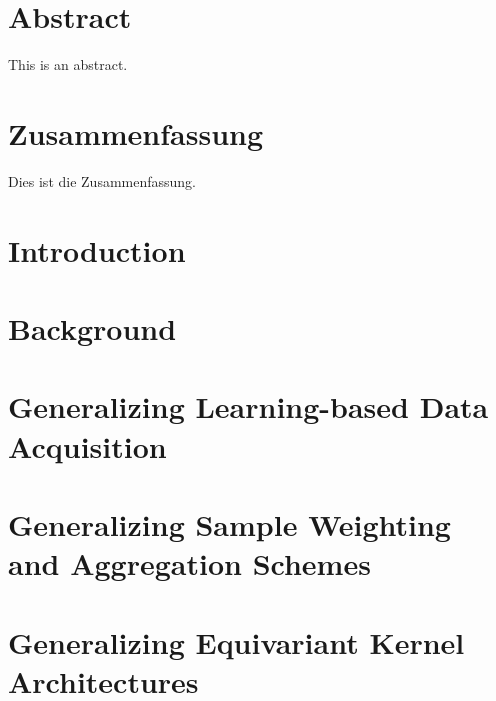\documentclass[11pt, a4paper, oneside, headsepline, titlepage, DIV=11, BCOR=12mm, captions=tableheading, chapterprefix=on, numbers=noenddot]{scrbook}
\begin{document}
    \thispagestyle{headings}
    

    \enlargethispage{1\baselineskip}
    \setcounter{page}{1}

    \chapter*{Abstract} %
        This is an abstract.
    \cleardoublepage

    \chapter*{Zusammenfassung} %
        Dies ist die Zusammenfassung.
    \cleardoublepage

    \tableofcontents
    \cleardoublepage

    \chapter{Introduction} %
    

    \chapter{Background} %
    

    \chapter{Generalizing Learning-based Data Acquisition}

    \chapter{Generalizing Sample Weighting and Aggregation Schemes}

    \chapter{Generalizing Equivariant Kernel Architectures}
\end{document}
